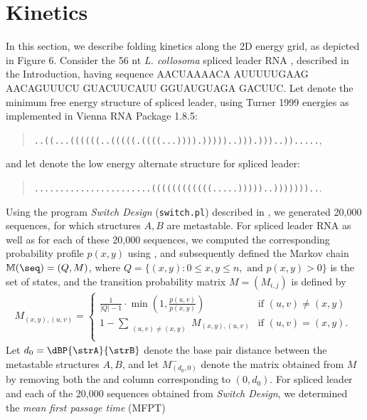 \section{Kinetics}
\label{section:kinetics}

In this section, we describe folding kinetics along the 2D energy
grid, as depicted in
Figure 6.
Consider the
56 nt {\em L. collosoma} spliced leader RNA \citep{lecuyerCrothers},
described in the Introduction, having
sequence AACUAAAACA AUUUUUGAAG AACAGUUUCU GUACUUCAUU GGUAUGUAGA
GACUUC.
Let \strA denote the minimum free energy structure of spliced leader,
using Turner 1999 energies as implemented in Vienna RNA Package 1.8.5:
\begin{quote}
{\tt ..((...((((((..(((((.((((...)))).)))))..))).)))..)).....},
\end{quote}
and let \strB denote the low energy alternate structure for spliced leader:
\begin{quote}
{\tt .......................((((((((((((.....)))))..)))))))..}.
\end{quote}
Using the program {\em Switch Design} ({\tt switch.pl}) described in
\citep{Flamm.r01}, we generated 20,000 sequences, for which structures
$A,B$ are metastable. For spliced leader RNA as well as for each of
these 20,000 sequences, we computed the corresponding
probability profile $p(x,y)$ using \ffttwo,
and subsequently defined the Markov chain ${\mathbb{M}}(\seq) = (Q,M)$, where
$Q = \{ (x,y) : 0 \leq x,y \leq n, \mbox{ and } p(x,y)>0 \}$
is the set of states, and the
transition probability matrix $M = (M_{i,j})$ is defined by
\begin{eqnarray*}
M_{(x,y), (u,v)} = \left\{ \begin{array}{ll}
\frac{1}{|Q|-1} \cdot \min(1, \frac{p(u,v)}{p(x,y)})
&\mbox{if $(u,v) \ne (x,y)$}\\
1 - \displaystyle\sum_{\substack{(u,v) \ne (x,y)}} M_{(x,y),(u,v)}
&\mbox{if $(u,v) = (x,y)$. }\\
\end{array} \right.
\end{eqnarray*}
Let $d_0=\dBP{\strA}{\strB}$ denote the base pair distance between the metastable
structures $A,B$, and let $M^{-}_{(d_0,0)}$ denote the matrix obtained from
$M$ by removing both the and column corresponding to $(0,d_0)$.
For spliced leader and each of the 20,000 sequences obtained from
{\em Switch Design}, we determined the {\em mean first passage time} (MFPT)
